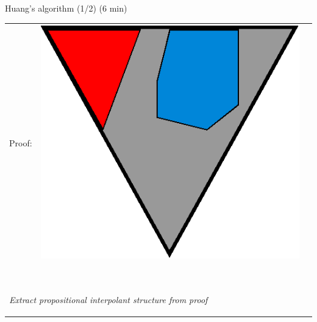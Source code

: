 \documentclass[final,compress]{beamer}
\begin{document}
\subsection{}
\begin{frame}{Huang's algorithm (1/2) (6 min)}
	\small
	
	\begin{tabular}{p{}ll}

		Proof: 
		&

		\multicolumn{1}{m{\fakemulticolwidth}}{
			\includegraphics[width=\proofwidth]{figures/two_phase_draft_proof}
		}
		&
		\vspace*{0.2em}
		\\

		\multicolumn{2}{l}{
			\proofindent{\stagearrow} ~\parbox[c]{14em}{\raggedright \emph{ Extract propositional interpolant structure from proof}}
			\vspace*{0.2em}
		}
		\\


\end{tabular}
\end{frame}
\end{document}
